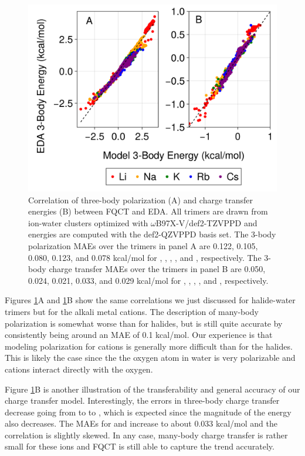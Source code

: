 \documentclass[journal=jctcce,manuscript=article]{achemso}
\begin{document}
\begin{figure}[h]
  \includegraphics*[width=\textwidth]{figures/three_body_pol_and_ct_cations.png}
  \caption{Correlation of three-body polarization (A) and charge transfer energies (B)
  between FQCT and EDA. All trimers are drawn from ion-water clusters optimized
  with $\omega$B97X-V/def2-TZVPPD and energies are computed with the def2-QZVPPD basis set.
  The 3-body polarization MAEs over the trimers in panel A are 0.122, 0.105, 0.080,
  0.123, and 0.078 kcal/mol for , , , , and ,
  respectively. The 3-body charge transfer MAEs over the trimers in panel B are
  0.050, 0.024, 0.021, 0.033, and 0.029 kcal/mol for , , , , and ,
  respectively.
}
  \label{fig:alkali_3b}
\end{figure}

Figures \ref{fig:alkali_3b}A and \ref{fig:alkali_3b}B show the same correlations we just discussed for halide-water trimers but for the alkali metal cations. The description of many-body polarization is somewhat worse than for halides, but is still quite accurate by consistently being around an MAE of 0.1 kcal/mol. Our experience is that modeling polarization for cations is generally more difficult than for the halides. This is likely the case since the the oxygen atom in water is very polarizable and cations interact directly with the oxygen.

Figure \ref{fig:alkali_3b}B is another illustration of the transferability and general accuracy of our charge transfer model. Interestingly, the errors in three-body charge transfer decrease going from  to  to , which is expected since the magnitude of the energy also decreases. The MAEs for  and  increase to about 0.033 kcal/mol and the correlation is slightly skewed. In any case, many-body charge transfer is rather small for these ions and FQCT is still able to capture the trend accurately.
\end{document}
